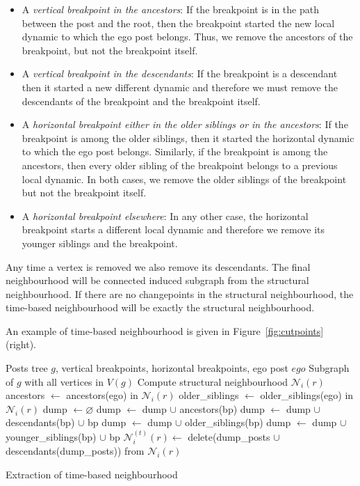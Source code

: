 \documentclass[conference]{IEEEtran}
\begin{document}
\begin{itemize}
\item A \textit{vertical breakpoint in the ancestors}: If the breakpoint is in the path between the post and the root, then the breakpoint started the new local dynamic to which the ego post belongs. Thus, we remove the ancestors of the breakpoint, but not the breakpoint itself.
\item A \textit{vertical breakpoint in the descendants}: If the breakpoint is a descendant then it started a new different dynamic and therefore we must remove the descendants of the breakpoint and the breakpoint itself. 
\item A \textit{horizontal breakpoint either in the older siblings or in the ancestors}: If the breakpoint is among the older siblings, then it started the horizontal dynamic to which the ego post belongs. Similarly, if the breakpoint is among the ancestors, then every older sibling of the breakpoint belongs to a previous local dynamic. In both cases, we remove the older siblings of the breakpoint but not the breakpoint itself.
\item A \textit{horizontal breakpoint elsewhere}: In any other case, the horizontal breakpoint starts a different local dynamic and therefore we remove its younger siblings and the breakpoint. 
\end{itemize}
Any time a vertex is removed we also remove its descendants. The final neighbourhood will be connected induced subgraph from the structural neighbourhood. If there are no changepoints in the structural neighbourhood, the time-based neighbourhood will be exactly the structural neighbourhood.

An example of time-based neighbourhood is given in Figure~\ref{fig:cutpoints} (right).

\begin{algorithm}[H]
\begin{algorithmic}
\REQUIRE Posts tree $g$, vertical breakpoints, horizontal breakpoints, ego post $ego$
\ENSURE Subgraph of $g$ with all vertices in $V(g)$
\STATE Compute structural neighbourhood $\mathcal{N}_i(r)$
\STATE ancestors $\leftarrow$  ancestors(ego) in $\mathcal{N}_i(r)$
\STATE older\_siblings $\leftarrow$ older\_siblings(ego) in $\mathcal{N}_i(r)$
\STATE dump $\leftarrow \varnothing$
   \STATE dump $\leftarrow$ dump $\cup$ ancestors(bp)
 \ELSE
   \STATE dump $\leftarrow$ dump $\cup$ descendants(bp) $\cup$ bp
  \ENDIF
\ENDFOR
{}
     \STATE dump $\leftarrow$ dump $\cup$ older\_siblings(bp)
   \ELSE
     \STATE dump $\leftarrow$ dump $\cup$ younger\_siblings(bp) $\cup$ bp
  \ENDIF
\ENDFOR
\STATE $\mathcal{N}_i^{(t)}(r) \leftarrow$ delete(dump\_posts $\cup$ descendants(dump\_posts)) from $\mathcal{N}_i(r)$
\end{algorithmic}
\caption{Extraction of time-based neighbourhood}
\label{alg:temporal_neighbourhood}
\end{algorithm}
\end{document}

